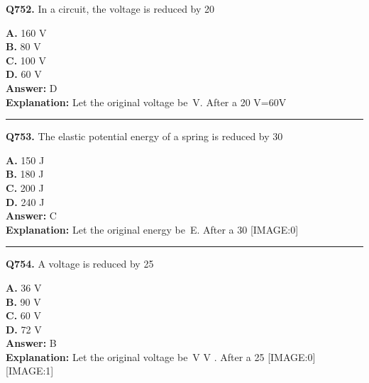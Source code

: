 \documentclass[12pt]{article}
\begin{document}
\noindent
\textbf{Q752.} In a circuit, the voltage is reduced by 20%



\textbf{A.} 160 V \\
\textbf{B.} 80 V \\
\textbf{C.} 100 V \\
\textbf{D.} 60 V \\

\textbf{Answer:} D \\
\textbf{Explanation:} Let the original voltage be V. After a 20%
V=60V

\hrule
\vspace{1em}


\noindent
\textbf{Q753.} The elastic potential energy of a spring is reduced by 30%



\textbf{A.} 150 J \\
\textbf{B.} 180 J \\
\textbf{C.} 200 J \\
\textbf{D.} 240 J \\

\textbf{Answer:} C \\
\textbf{Explanation:} Let the original energy be E. After a 30%
[IMAGE:0]

\hrule
\vspace{1em}


\noindent
\textbf{Q754.} A voltage is reduced by 25%



\textbf{A.} 36 V \\
\textbf{B.} 90 V \\
\textbf{C.} 60 V \\
\textbf{D.} 72 V \\

\textbf{Answer:} B \\
\textbf{Explanation:} Let the original voltage be V
V
. After a 25%
[IMAGE:0]
[IMAGE:1]
\end{document}
